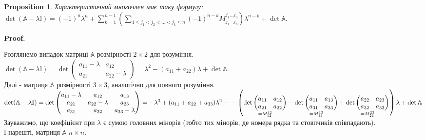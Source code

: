 \documentclass[a4paper, 10pt]{article}
\makeatletter
\def\huge{\displaystyle}
\def\qed{$\blacksquare$}
\theoremstyle{theoremdd}
\theoremstyle{theoremdd}
\theoremstyle{theoremdd}
\theoremstyle{theoremdd}
\theoremstyle{theoremdd}
\newtheorem{proposition}[theorem]{Proposition}
\theoremstyle{theoremdd}
\theoremstyle{theoremdd}
\theoremstyle{theoremdd}
\renewenvironment{proof}[1][Proof.\\]{\par
\pushQED{\hfill \qed}%
\normalfont \topsep6\p@\@plus6\p@\relax
\trivlist
\item\relax
{\bfseries
#1\@addpunct{.}}\hspace\labelsep\ignorespaces
}{%
\popQED\endtrivlist\@endpefalse
}
\makeatother
\begin{document}
\begin{proposition}
Характеристичний многочлен має таку формулу: \\ $\det(\mathbb{A} - \lambda \mathbb{I}) = \huge (-1)^n \lambda^n + \sum_{k=1}^{n-1} \left( \sum_{1 \leq j_1 < j_2 < \dots < j_k \leq n} (-1)^{n-k} M_{j_1 \dots j_n}^{j_1 \dots j_n} \right) \lambda^{n-k} + \det \mathbb{A}$.
\end{proposition}

\begin{proof}
Розглянемо випадок матриці $\mathbb{A}$ розмірності $2 \times 2$ для розуміння.\\
$\det (\mathbb{A} - \lambda \mathbb{I}) = \det \begin{pmatrix}
a_{11}-\lambda & a_{12} \\
a_{21} & a_{22} - \lambda
\end{pmatrix} = \lambda^2 - (a_{11}+a_{22})\lambda + \det \mathbb{A}$.
\bigskip \\
Далі - матриця $\mathbb{A}$ розмірності $3 \times 3$, аналогічно для повного розуміння.\\
$\det (\mathbb{A} - \lambda \mathbb{I}) = \det \begin{pmatrix}
a_{11}-\lambda & a_{12} & a_{13} \\
a_{21} & a_{22}-\lambda & a_{23} \\
a_{31} & a_{32} & a_{33}-\lambda \\
\end{pmatrix} = -\lambda^3 + (a_{11}+a_{22}+a_{33})\lambda^2 - \\ - \left(\underset{=M_{12}^{12}}{\det \begin{pmatrix}
a_{11} & a_{12} \\
a_{21} & a_{22}
\end{pmatrix}} - \underset{=M_{13}^{13}}{\det \begin{pmatrix}
a_{11} & a_{13} \\
a_{31} & a_{33}
\end{pmatrix}} + \underset{=M_{23}^{23}}{\det \begin{pmatrix}
a_{22} & a_{23} \\
a_{32} & a_{33}
\end{pmatrix}} \right)\lambda + \det \mathbb{A}$\\
Зауважимо, що коефіцієнт при $\lambda$ є сумою головних мінорів (тобто тих мінорів, де номера рядка та стовпчиків співпадають).
\bigskip \\
І нарешті, матриця $\mathbb{A}$ $n \times n$.\\

\end{proof}
\end{document}
